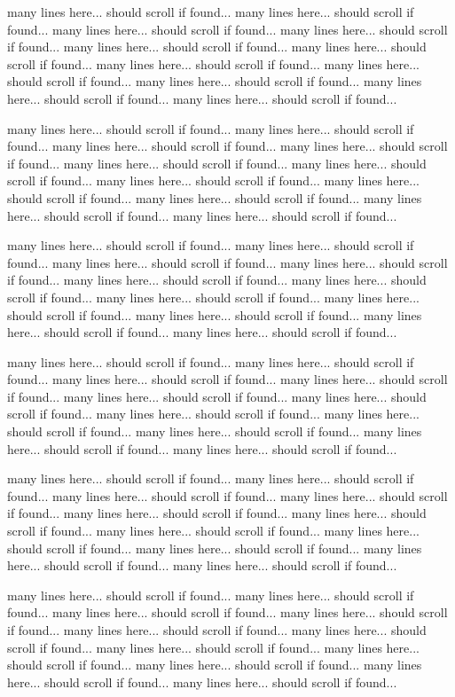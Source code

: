 {{{{many lines here... should scroll if found...
many lines here... should scroll if found...
many lines here... should scroll if found...
many lines here... should scroll if found...
many lines here... should scroll if found...
many lines here... should scroll if found...
many lines here... should scroll if found...
many lines here... should scroll if found...
many lines here... should scroll if found...
many lines here... should scroll if found...
many lines here... should scroll if found...

many lines here... should scroll if found...
many lines here... should scroll if found...
many lines here... should scroll if found...
many lines here... should scroll if found...
many lines here... should scroll if found...
many lines here... should scroll if found...
many lines here... should scroll if found...
many lines here... should scroll if found...
many lines here... should scroll if found...
many lines here... should scroll if found...
many lines here... should scroll if found...

many lines here... should scroll if found...
many lines here... should scroll if found...
many lines here... should scroll if found...
many lines here... should scroll if found...
many lines here... should scroll if found...
many lines here... should scroll if found...
many lines here... should scroll if found...
many lines here... should scroll if found...
many lines here... should scroll if found...
many lines here... should scroll if found...
many lines here... should scroll if found...

many lines here... should scroll if found...
many lines here... should scroll if found...
many lines here... should scroll if found...
many lines here... should scroll if found...
many lines here... should scroll if found...
many lines here... should scroll if found...
many lines here... should scroll if found...
many lines here... should scroll if found...
many lines here... should scroll if found...
many lines here... should scroll if found...
many lines here... should scroll if found...

many lines here... should scroll if found...
many lines here... should scroll if found...
many lines here... should scroll if found...
many lines here... should scroll if found...
many lines here... should scroll if found...
many lines here... should scroll if found...
many lines here... should scroll if found...
many lines here... should scroll if found...
many lines here... should scroll if found...
many lines here... should scroll if found...
many lines here... should scroll if found...

many lines here... should scroll if found...
many lines here... should scroll if found...
many lines here... should scroll if found...
many lines here... should scroll if found...
many lines here... should scroll if found...
many lines here... should scroll if found...
many lines here... should scroll if found...
many lines here... should scroll if found...
many lines here... should scroll if found...
many lines here... should scroll if found...
many lines here... should scroll if found...

%
$$
{}}
}}}

